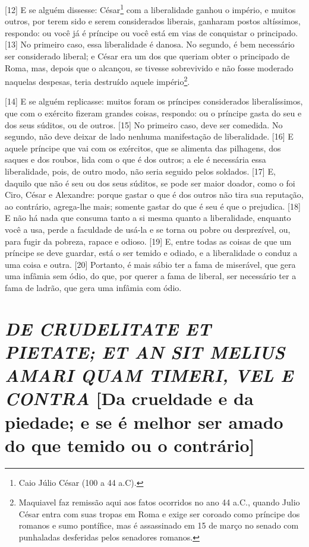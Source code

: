 {[}12{]} E se alguém dissesse: César\footnote{Caio Júlio César (100 a 44
  a.C).} com a liberalidade ganhou o império, e muitos outros, por terem
sido e serem considerados liberais, ganharam postos altíssimos,
respondo: ou você já é príncipe ou você está em vias de conquistar o
principado. {[}13{]} No primeiro caso, essa liberalidade é danosa. No
segundo, é bem necessário ser considerado liberal; e César era um dos
que queriam obter o principado de Roma, mas, depois que o alcançou, se
tivesse sobrevivido e não fosse moderado naquelas despesas, teria
destruído aquele império\footnote{Maquiavel faz remissão aqui aos fatos
  ocorridos no ano 44 a.C., quando Julio César entra com suas tropas em
  Roma e exige ser coroado como príncipe dos romanos e sumo pontífice,
  mas é assassinado em 15 de março no senado com punhaladas desferidas
  pelos senadores romanos.}.

{[}14{]} E se alguém replicasse: muitos foram os príncipes considerados
liberalíssimos, que com o exército fizeram grandes coisas, respondo: ou
o príncipe gasta do seu e dos seus súditos, ou de outros. {[}15{]} No
primeiro caso, deve ser comedida. No segundo, não deve deixar de lado
nenhuma manifestação de liberalidade. {[}16{]} E aquele príncipe que vai
com os exércitos, que se alimenta das pilhagens, dos saques e dos
roubos, lida com o que é dos outros; a ele é necessária essa
liberalidade, pois, de outro modo, não seria seguido pelos soldados.
{[}17{]} E, daquilo que não é seu ou dos seus súditos, se pode ser maior
doador, como o foi Ciro, César e Alexandre: porque gastar o que é dos
outros não tira sua reputação, ao contrário, agrega-lhe mais; somente
gastar do que é seu é que o prejudica. {[}18{]} E não há nada que
consuma tanto a si mesma quanto a liberalidade, enquanto você a usa,
perde a faculdade de usá-la e se torna ou pobre ou desprezível, ou, para
fugir da pobreza, rapace e odioso. {[}19{]} E, entre todas as coisas de
que um príncipe se deve guardar, está o ser temido e odiado, e a
liberalidade o conduz a uma coisa e outra. {[}20{]} Portanto, é mais
sábio ter a fama de miserável, que gera uma infâmia sem ódio, do que,
por querer a fama de liberal, ser necessário ter a fama de ladrão, que
gera uma infâmia com ódio.

\quebra\section{\emph{DE CRUDELITATE ET PIETATE; ET AN SIT MELIUS AMARI QUAM TIMERI, VEL
E CONTRA}
{[}Da crueldade e da piedade; e se é melhor ser amado do que temido ou o
contrário{]}}

